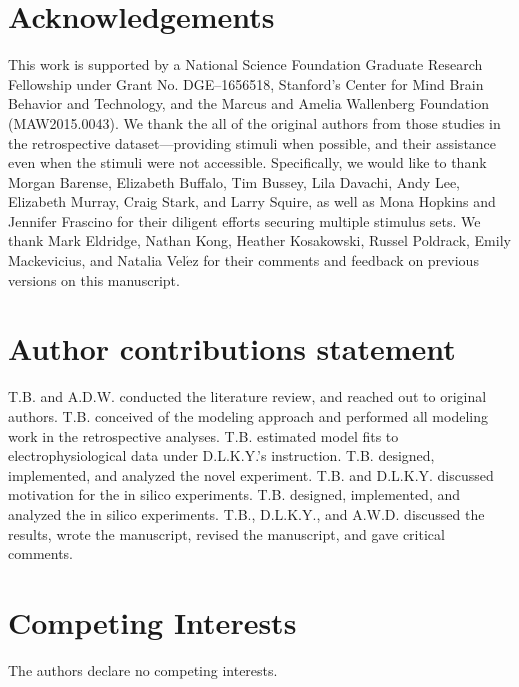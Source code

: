 \documentclass[11pt]{article}
\begin{document}



\section{Acknowledgements}

This work is supported by a National Science Foundation Graduate Research Fellowship under Grant No. DGE–1656518, Stanford’s Center for Mind Brain Behavior and Technology, and the Marcus and Amelia Wallenberg Foundation (MAW2015.0043). We thank the all of the original authors from those studies in the retrospective dataset---providing stimuli when possible, and their assistance even when the stimuli were not accessible. Specifically, we would like to thank Morgan Barense, Elizabeth Buffalo, Tim Bussey, Lila Davachi, Andy Lee, Elizabeth Murray, Craig Stark, and Larry Squire, as well as Mona Hopkins and Jennifer Frascino for their diligent efforts securing multiple stimulus sets. We thank Mark Eldridge, Nathan Kong, Heather Kosakowski, Russel Poldrack, Emily Mackevicius, and Natalia Vel$\acute{\text{e}}$z for their comments and feedback on previous versions on this manuscript. 

\section{Author contributions statement}

T.B. and A.D.W. conducted the literature review, and reached out to original authors. T.B. conceived of the modeling approach and performed all modeling work in the retrospective analyses. T.B. estimated model fits to electrophysiological data under D.L.K.Y.'s instruction. T.B. designed, implemented, and analyzed the novel experiment. T.B. and D.L.K.Y. discussed motivation for the in silico experiments. T.B. designed, implemented, and analyzed the in silico experiments. T.B., D.L.K.Y., and A.W.D. discussed the results, wrote the manuscript, revised the manuscript, and gave critical comments.

\section{Competing Interests}

The authors declare no competing interests.
\end{document}
